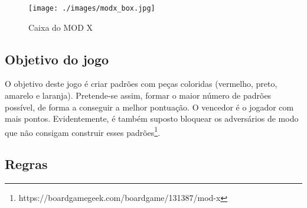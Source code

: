 \documentclass[a4paper]{article}
\begin{document}
\begin{figure}[h!]
	\begin{center}
		\texttt{[image: ./images/modx\_box.jpg]}
		\caption{Caixa do MOD X}
		\label{fig:1}
	\end{center}
\end{figure}

\subsection{Objetivo do jogo}

O objetivo deste jogo é criar padrões com peças coloridas (vermelho, preto, amarelo e laranja).
Pretende-se assim, formar o maior número de padrões possível, de forma a conseguir a melhor pontuação.
O vencedor é o jogador com mais pontos.
Evidentemente, é também suposto bloquear os adversários de modo que não consigam construir esses padrões\footnote{https://boardgamegeek.com/boardgame/131387/mod-x}.  

\subsection{Regras}
\end{document}
